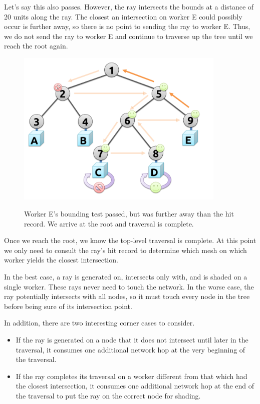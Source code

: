 \documentclass[12pt]{ucthesis}
\newcommand{\captionfonts}{\small\bf\ssp}
\begin{document}
Let's say this also passes. However, the ray intersects the bounds at a distance
of 20 units along the ray. The closest an intersection on worker E could
possibly occur is further away, so there is no point to sending the ray to
worker E. Thus, we do not send the ray to worker E and continue to traverse up
the tree until we reach the root again.

\begin{figure}[H]
    \centering
    \includegraphics[width=100mm]{figures/traversal7.pdf}
    \captionfonts
    \caption{Worker E's bounding test passed, but was further away than the hit record. We arrive at the root and traversal is complete.}
    \label{fig:traversal7}
\end{figure}

Once we reach the root, we know the top-level traversal is complete. At this
point we only need to consult the ray's hit record to determine which mesh on
which worker yields the closest intersection.

In the best case, a ray is generated on, intersects only with, and is shaded on
a single worker. These rays never need to touch the network. In the worse case,
the ray potentially intersects with all nodes, so it must touch every node in
the tree before being sure of its intersection point.

In addition, there are two interesting corner cases to consider.

\begin{itemize}
    \item If the ray is generated on a node that it does not intersect until
        later in the traversal, it consumes one additional network hop at the
        very beginning of the traversal.
    \item If the ray completes its traversal on a worker different from that
        which had the closest intersection, it consumes one additional network hop
        at the end of the traversal to put the ray on the correct node for
        shading.
\end{itemize}
\end{document}
